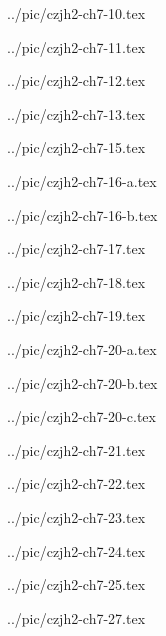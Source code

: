 ../pic/czjh2-ch7-10.tex



../pic/czjh2-ch7-11.tex



../pic/czjh2-ch7-12.tex



../pic/czjh2-ch7-13.tex



../pic/czjh2-ch7-15.tex



../pic/czjh2-ch7-16-a.tex



../pic/czjh2-ch7-16-b.tex



../pic/czjh2-ch7-17.tex



../pic/czjh2-ch7-18.tex



../pic/czjh2-ch7-19.tex



../pic/czjh2-ch7-20-a.tex



../pic/czjh2-ch7-20-b.tex



../pic/czjh2-ch7-20-c.tex



../pic/czjh2-ch7-21.tex



../pic/czjh2-ch7-22.tex



../pic/czjh2-ch7-23.tex



../pic/czjh2-ch7-24.tex



../pic/czjh2-ch7-25.tex



../pic/czjh2-ch7-27.tex



